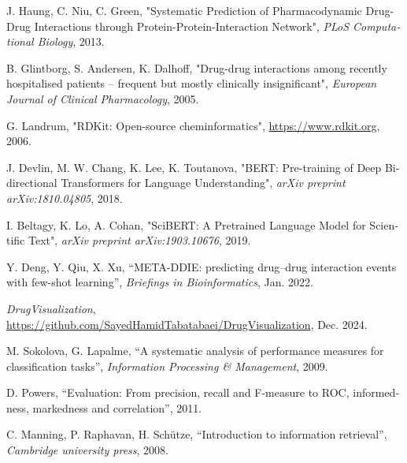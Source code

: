 \begin{thebibliography}{99}
\begin{latin}
J. Haung, C. Niu, C. Green, "Systematic Prediction of Pharmacodynamic Drug-Drug Interactions through Protein-Protein-Interaction Network", \textit{PLoS Computational Biology}, 2013.

B. Glintborg, S. Andersen, K. Dalhoff, "Drug-drug interactions among recently hospitalised patients – frequent but mostly clinically insignificant", \textit{European Journal of Clinical Pharmacology}, 2005.

G. Landrum, "RDKit: Open-source cheminformatics", \url{https://www.rdkit.org}, 2006.

J. Devlin, M. W. Chang, K. Lee, K. Toutanova, "BERT: Pre-training of Deep Bidirectional Transformers for Language Understanding", \textit{arXiv preprint arXiv:1810.04805}, 2018.

I. Beltagy, K. Lo, A. Cohan, "SciBERT: A Pretrained Language Model for Scientific Text", \textit{arXiv preprint arXiv:1903.10676}, 2019.

Y. Deng, Y. Qiu, X. Xu, “META-DDIE: predicting drug–drug interaction events with few-shot learning”, \textit{Briefings in Bioinformatics}, Jan. 2022.

\textit{DrugVisualization}, \url{https://github.com/SayedHamidTabatabaei/DrugVisualization}, Dec. 2024.

M. Sokolova, G. Lapalme, “A systematic analysis of performance measures for classification tasks”, \textit{Information Processing \& Management}, 2009.

D. Powers, “Evaluation: From precision, recall and F-measure to ROC, informedness, markedness and correlation”, 2011.

C. Manning, P. Raphavan, H. Schütze, “Introduction to information retrieval”, \textit{Cambridge university press}, 2008.






\end{latin}
\end{thebibliography}
